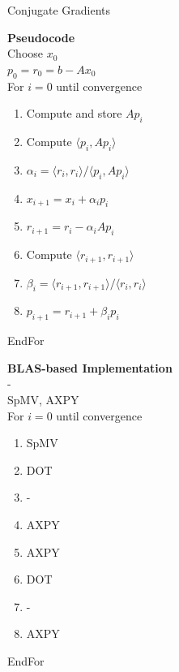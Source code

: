 \begin{frame}[fragile]{Conjugate Gradients}

 \begin{block}{}
  
   \begin{minipage}{0.45\textwidth}
      {\large \textbf{Pseudocode}} \\
      
      Choose $x_0$ \\
      $p_0 = r_0 = b - Ax_0$ \\
      For $i=0$ until convergence
     \begin{enumerate}
      \item Compute and store $Ap_i$
      \item Compute $\langle p_i, Ap_i \rangle$
      \item $\alpha_i = \langle r_i, r_i \rangle / \langle p_i, Ap_i \rangle$
      \item $x_{i+1} = x_{i} + \alpha_i p_i$          
      \item $r_{i+1} = r_i - \alpha_i Ap_i$       
      \item Compute $\langle r_{i+1}, r_{i+1} \rangle$
      \item $\beta_i = \langle r_{i+1}, r_{i+1} \rangle / \langle r_i, r_i \rangle$
      \item $p_{i+1} = r_{i+1} + \beta_i p_i$
     \end{enumerate}
     EndFor
   \end{minipage}
   \begin{minipage}{0.48\textwidth}
      {\large \textbf{BLAS-based Implementation}} \\
      
            - \\
      SpMV, AXPY \\
      For $i=0$ until convergence
     \begin{enumerate}
      \item SpMV
      \item DOT
      \item -
      \item AXPY         
      \item AXPY
      \item DOT
      \item -
      \item AXPY
     \end{enumerate}
     EndFor
   \end{minipage}
   
   \end{block}
   
\end{frame}


